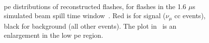 \begin{figure}[]
\begin{adjustwidth}{-1cm}{-1cm}
\centering
 \\ 
\caption[Flash \acrshort{pe} Distribution]{\acrshort{pe} distributions of reconstructed flashes, for flashes in the 1.6 $\mu$s simulated beam spill time window~\protect{}. Red is for signal ($\nu_\mu$ \acrshort{cc} events), black for background (all other events). The plot in~\protect{} is an enlargement in the low \acrshort{pe} region.}
\label{fig:flash_pe}
\end{adjustwidth}
\end{figure}

